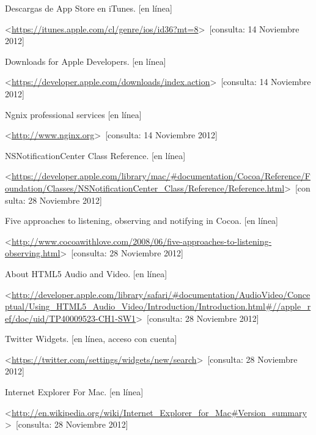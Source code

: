 \begin{thebibliography}{99}
\begin{sloppypar}
Descargas de App Store en iTunes. [en línea]\

\textless \url{https://itunes.apple.com/cl/genre/ios/id36?mt=8}\textgreater \ [consulta: 14 Noviembre 2012] 

Downloads for Apple Developers. [en línea]\

\textless \url{https://developer.apple.com/downloads/index.action}\textgreater \ [consulta: 14 Noviembre 2012]

Ngnix professional services [en línea]\

\textless \url{http://www.nginx.org}\textgreater \ [consulta: 14 Noviembre 2012]

NSNotificationCenter Class Reference. [en línea]\

\textless \url{https://developer.apple.com/library/mac/#documentation/Cocoa/Reference/Foundation/Classes/NSNotificationCenter_Class/Reference/Reference.html}\textgreater \ [consulta: 28 Noviembre 2012]

Five approaches to listening, observing and notifying in Cocoa. [en línea]\

\textless \url{http://www.cocoawithlove.com/2008/06/five-approaches-to-listening-observing.html}\textgreater \ [consulta: 28 Noviembre 2012]

About HTML5 Audio and Video. [en línea]\

\textless \url{http://developer.apple.com/library/safari/#documentation/AudioVideo/Conceptual/Using_HTML5_Audio_Video/Introduction/Introduction.html#//apple_ref/doc/uid/TP40009523-CH1-SW1}\textgreater \ [consulta: 28 Noviembre 2012]

Twitter Widgets. [en línea, acceso con cuenta]\

\textless \url{https://twitter.com/settings/widgets/new/search}\textgreater \ [consulta: 28 Noviembre 2012]

Internet Explorer For Mac. [en línea]\

\textless \url{http://en.wikipedia.org/wiki/Internet_Explorer_for_Mac#Version_summary}\textgreater \ [consulta: 28 Noviembre 2012]





\end{sloppypar}
\end{thebibliography}
